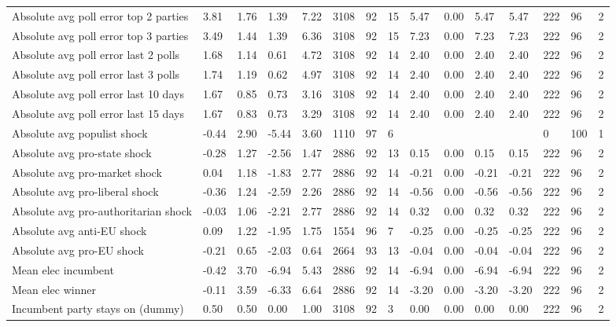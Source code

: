 \begin{longtable}{lllllllllllllll}
Absolute avg poll error top 2 parties & 3.81 & 1.76 & 1.39 & 7.22 & 3108 & 92 & 15 & 5.47 & 0.00 & 5.47 & 5.47 & 222 & 96 & 2\\
Absolute avg poll error top 3 parties & 3.49 & 1.44 & 1.39 & 6.36 & 3108 & 92 & 15 & 7.23 & 0.00 & 7.23 & 7.23 & 222 & 96 & 2\\
Absolute avg poll error last 2 polls & 1.68 & 1.14 & 0.61 & 4.72 & 3108 & 92 & 14 & 2.40 & 0.00 & 2.40 & 2.40 & 222 & 96 & 2\\
\addlinespace
Absolute avg poll error last 3 polls & 1.74 & 1.19 & 0.62 & 4.97 & 3108 & 92 & 14 & 2.40 & 0.00 & 2.40 & 2.40 & 222 & 96 & 2\\
Absolute avg poll error last 10 days & 1.67 & 0.85 & 0.73 & 3.16 & 3108 & 92 & 14 & 2.40 & 0.00 & 2.40 & 2.40 & 222 & 96 & 2\\
Absolute avg poll error last 15 days & 1.67 & 0.83 & 0.73 & 3.29 & 3108 & 92 & 14 & 2.40 & 0.00 & 2.40 & 2.40 & 222 & 96 & 2\\
Absolute avg populist shock & -0.44 & 2.90 & -5.44 & 3.60 & 1110 & 97 & 6 &  &  &  &  & 0 & 100 & 1\\
Absolute avg pro-state shock & -0.28 & 1.27 & -2.56 & 1.47 & 2886 & 92 & 13 & 0.15 & 0.00 & 0.15 & 0.15 & 222 & 96 & 2\\
\addlinespace
Absolute avg pro-market shock & 0.04 & 1.18 & -1.83 & 2.77 & 2886 & 92 & 14 & -0.21 & 0.00 & -0.21 & -0.21 & 222 & 96 & 2\\
Absolute avg pro-liberal shock & -0.36 & 1.24 & -2.59 & 2.26 & 2886 & 92 & 14 & -0.56 & 0.00 & -0.56 & -0.56 & 222 & 96 & 2\\
Absolute avg pro-authoritarian shock & -0.03 & 1.06 & -2.21 & 2.77 & 2886 & 92 & 14 & 0.32 & 0.00 & 0.32 & 0.32 & 222 & 96 & 2\\
Absolute avg anti-EU shock & 0.09 & 1.22 & -1.95 & 1.75 & 1554 & 96 & 7 & -0.25 & 0.00 & -0.25 & -0.25 & 222 & 96 & 2\\
Absolute avg pro-EU shock & -0.21 & 0.65 & -2.03 & 0.64 & 2664 & 93 & 13 & -0.04 & 0.00 & -0.04 & -0.04 & 222 & 96 & 2\\
\addlinespace
Mean elec incumbent & -0.42 & 3.70 & -6.94 & 5.43 & 2886 & 92 & 14 & -6.94 & 0.00 & -6.94 & -6.94 & 222 & 96 & 2\\
Mean elec winner & -0.11 & 3.59 & -6.33 & 6.64 & 2886 & 92 & 14 & -3.20 & 0.00 & -3.20 & -3.20 & 222 & 96 & 2\\
Incumbent party stays on (dummy) & 0.50 & 0.50 & 0.00 & 1.00 & 3108 & 92 & 3 & 0.00 & 0.00 & 0.00 & 0.00 & 222 & 96 & 2\\

\end{longtable}
